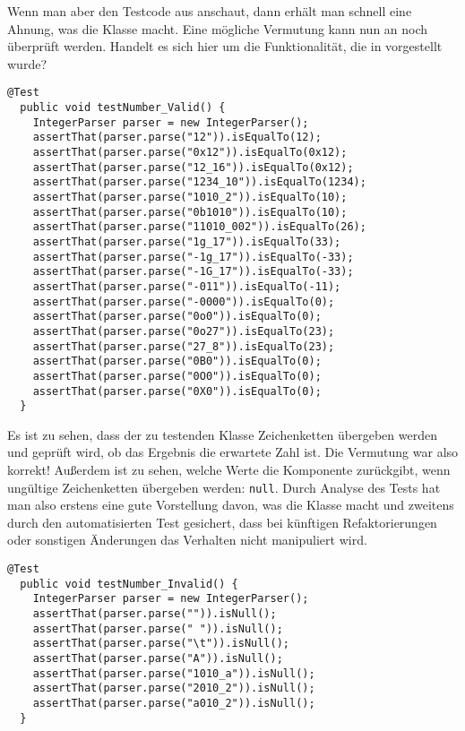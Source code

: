 Wenn man aber den Testcode aus  anschaut, dann erhält man schnell eine Ahnung, was die Klasse macht. Eine mögliche Vermutung kann nun an  noch überprüft werden. Handelt es sich hier um die Funktionalität, die in  vorgestellt wurde?

\begin{lstlisting}[caption={\klasse{IntegerParser} -- Test auf Validität},label=\lstlbl{integerparser-test1}]
  @Test
  public void testNumber_Valid() {
    IntegerParser parser = new IntegerParser();
    assertThat(parser.parse("12")).isEqualTo(12);
    assertThat(parser.parse("0x12")).isEqualTo(0x12);
    assertThat(parser.parse("12_16")).isEqualTo(0x12);
    assertThat(parser.parse("1234_10")).isEqualTo(1234);
    assertThat(parser.parse("1010_2")).isEqualTo(10);
    assertThat(parser.parse("0b1010")).isEqualTo(10);
    assertThat(parser.parse("11010_002")).isEqualTo(26);
    assertThat(parser.parse("1g_17")).isEqualTo(33);
    assertThat(parser.parse("-1g_17")).isEqualTo(-33);
    assertThat(parser.parse("-1G_17")).isEqualTo(-33);
    assertThat(parser.parse("-011")).isEqualTo(-11);
    assertThat(parser.parse("-0000")).isEqualTo(0);
    assertThat(parser.parse("0o0")).isEqualTo(0);
    assertThat(parser.parse("0o27")).isEqualTo(23);
    assertThat(parser.parse("27_8")).isEqualTo(23);
    assertThat(parser.parse("0B0")).isEqualTo(0);
    assertThat(parser.parse("0O0")).isEqualTo(0);
    assertThat(parser.parse("0X0")).isEqualTo(0);
  }
\end{lstlisting}

Es ist zu sehen, dass der zu testenden Klasse Zeichenketten übergeben werden und geprüft wird, ob das Ergebnis die erwartete Zahl ist. Die Vermutung war also korrekt! Außerdem ist zu sehen, welche Werte die Komponente zurückgibt, wenn ungültige Zeichenketten übergeben werden: \texttt{null}. Durch Analyse des Tests hat man also erstens eine gute Vorstellung davon, was die Klasse macht und zweitens durch den automatisierten Test gesichert, dass bei künftigen Refaktorierungen oder sonstigen Änderungen das Verhalten nicht manipuliert wird.

\begin{lstlisting}[caption={\klasse{IntegerParser} -- Test auf Invalidität},label=\lstlbl{integerparser-test2}]
  @Test
  public void testNumber_Invalid() {
    IntegerParser parser = new IntegerParser();
    assertThat(parser.parse("")).isNull();
    assertThat(parser.parse(" ")).isNull();
    assertThat(parser.parse("\t")).isNull();
    assertThat(parser.parse("A")).isNull();
    assertThat(parser.parse("1010_a")).isNull();
    assertThat(parser.parse("2010_2")).isNull();
    assertThat(parser.parse("a010_2")).isNull();
  }
\end{lstlisting}

